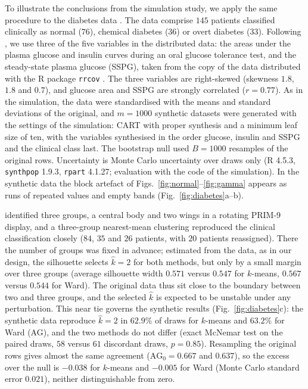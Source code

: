 \documentclass[pdflatex,referee]{sn-jnl}
\begin{document}
To illustrate the conclusions from the simulation study, we apply the same
procedure to the diabetes data \citep{reaven1979}. The data comprise $145$
patients classified clinically as normal ($76$), chemical diabetes ($36$) or
overt diabetes ($33$). Following \citet{reaven1979}, we use three of the five
variables in the distributed data: the areas under the plasma glucose and
insulin curves during an oral glucose tolerance test, and the steady-state
plasma glucose (SSPG), taken from the copy of the data distributed with the
\textsf{R} package \texttt{rrcov} \citep{todorov2009}. The three variables are
right-skewed (skewness $1.8$, $1.8$ and $0.7$), and glucose area and SSPG are
strongly correlated ($r = 0.77$). As in the simulation, the data were
standardised with the means and standard deviations of the original, and
$m = 1000$ synthetic datasets were generated with the settings of the
simulation: CART with proper synthesis and a minimum leaf size of ten, with the
variables synthesised in the order glucose, insulin and SSPG and the clinical
class last. The bootstrap null used $B = 1000$ resamples of the original rows.
Uncertainty is Monte Carlo uncertainty over draws only (\textsf{R} 4.5.3,
\texttt{synthpop} 1.9.3, \texttt{rpart} 4.1.27; evaluation with the code of the
simulation). In the synthetic data the block artefact of
Figs.~\ref{fig:normal}--\ref{fig:gamma} appears as runs of repeated values and
empty bands (Fig.~\ref{fig:diabetes}a--b).

\citet{reaven1979} identified three groups, a central body and two wings in a
rotating PRIM-9 display, and a three-group nearest-mean clustering
\citep{friedman1967} reproduced the clinical classification closely ($84$,
$35$ and $26$ patients, with $20$ patients reassigned). There the number of
groups was fixed in advance; estimated from the data, as in our design, the
silhouette selects $\hat k = 2$ for both methods, but only by
a small margin over three groups (average silhouette width $0.571$ versus
$0.547$ for $k$-means, $0.567$ versus $0.544$ for Ward). The original data thus
sit close to the boundary between two and three groups, and the selected
$\hat k$ is expected to be unstable under any perturbation. This near tie
governs the synthetic results (Fig.~\ref{fig:diabetes}c): the synthetic data
reproduce $\hat k = 2$ in $62.9\%$ of draws for $k$-means and $63.2\%$ for Ward
(AG), and the two methods do not differ (exact McNemar test on the paired
draws, $58$ versus $61$ discordant draws, $p = 0.85$). Resampling the original
rows gives almost the same agreement ($\mathrm{AG}_0 = 0.667$ and $0.637$), so
the excess over the null is $-0.038$ for $k$-means and $-0.005$ for Ward (Monte
Carlo standard error $0.021$), neither distinguishable from zero.
\end{document}
